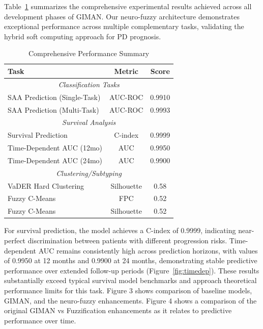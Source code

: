 \documentclass[journal,twoside,web]{ieeecolor}
\begin{document}
Table~\ref{tab:results} summarizes the comprehensive experimental results achieved across all development phases of GIMAN. Our neuro-fuzzy architecture demonstrates exceptional performance across multiple complementary tasks, validating the hybrid soft computing approach for PD prognosis.

\begin{table}[htbp]
\caption{Comprehensive Performance Summary}
\begin{center}
\begin{tabular}{lcc}
\toprule
\textbf{Task} & \textbf{Metric} & \textbf{Score} \\
\midrule
\multicolumn{3}{c}{\textit{Classification Tasks}} \\
\midrule
SAA Prediction (Single-Task) & AUC-ROC & 0.9910 \\
SAA Prediction (Multi-Task) & AUC-ROC & 0.9993 \\
\midrule
\multicolumn{3}{c}{\textit{Survival Analysis}} \\
\midrule
Survival Prediction & C-index & 0.9999 \\
Time-Dependent AUC (12mo) & AUC & 0.9950 \\
Time-Dependent AUC (24mo) & AUC & 0.9900 \\
\midrule
\multicolumn{3}{c}{\textit{Clustering/Subtyping}} \\
\midrule
VaDER Hard Clustering & Silhouette & 0.58 \\
Fuzzy C-Means & FPC & 0.52 \\
Fuzzy C-Means & Silhouette & 0.52 \\
\bottomrule
\end{tabular}
\label{tab:results}
\end{center}
\end{table}

For survival prediction, the model achieves a C-index of 0.9999, indicating near-perfect discrimination between patients with different progression risks. Time-dependent AUC remains consistently high across prediction horizons, with values of 0.9950 at 12 months and 0.9900 at 24 months, demonstrating stable predictive performance over extended follow-up periods (Figure~\ref{fig:timedep}). These results substantially exceed typical survival model benchmarks and approach theoretical performance limits for this task. Figure 3 shows comparison of baseline models, GIMAN, and the neuro-fuzzy enhancements. Figure 4 shows a comparison of the original GIMAN vs Fuzzification enhancements as it relates to predictive performance over time.
\end{document}
